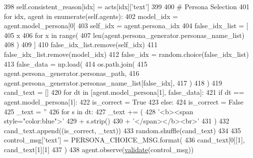 \begin{DoxyCode}
398                             self.consistent\_reason[idx] = acts[idx][\textcolor{stringliteral}{'text'}]
399 
400                     \textcolor{comment}{# Persona Selection}
401                     \textcolor{keywordflow}{for} idx, agent \textcolor{keywordflow}{in} enumerate(self.agents):
402                         model\_idx = agent.model\_persona[0]
403                         self\_idx = agent.persona\_idx
404                         false\_idx\_list = [
405                             x
406                             \textcolor{keywordflow}{for} x \textcolor{keywordflow}{in} range(
407                                 len(agent.persona\_generator.personas\_name\_list)
408                             )
409                         ]
410                         false\_idx\_list.remove(self\_idx)
411                         false\_idx\_list.remove(model\_idx)
412                         false\_idx = random.choice(false\_idx\_list)
413                         false\_data = np.load(
414                             os.path.join(
415                                 agent.persona\_generator.personas\_path,
416                                 agent.persona\_generator.personas\_name\_list[false\_idx],
417                             )
418                         )
419                         cand\_text = []
420                         \textcolor{keywordflow}{for} dt \textcolor{keywordflow}{in} [agent.model\_persona[1], false\_data]:
421                             \textcolor{keywordflow}{if} dt == agent.model\_persona[1]:
422                                 is\_correct = \textcolor{keyword}{True}
423                             \textcolor{keywordflow}{else}:
424                                 is\_correct = \textcolor{keyword}{False}
425                             \_text = \textcolor{stringliteral}{''}
426                             \textcolor{keywordflow}{for} s \textcolor{keywordflow}{in} dt:
427                                 \_text += (
428                                     \textcolor{stringliteral}{'<b><span style="color:blue">'}
429                                     + s.strip()
430                                     + \textcolor{stringliteral}{'</span></b><br>'}
431                                 )
432                             cand\_text.append((is\_correct, \_text))
433                         random.shuffle(cand\_text)
434 
435                         control\_msg[\textcolor{stringliteral}{'text'}] = PERSONA\_CHOICE\_MSG.format(
436                             cand\_text[0][1], cand\_text[1][1]
437                         )
438                         agent.observe(\hyperlink{namespaceparlai_1_1core_1_1worlds_afc3fad603b7bce41dbdc9cdc04a9c794}{validate}(control\_msg))

\end{DoxyCode}
